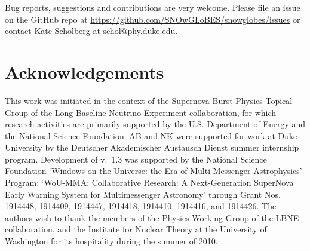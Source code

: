 \documentclass{article}
\begin{document}
Bug reports, suggestions and contributions are very welcome.
Please file an issue on the GitHub repo at \url{https://github.com/SNOwGLoBES/snowglobes/issues} or contact Kate Scholberg at \href{mailto:schol@phy.duke.edu}{schol@phy.duke.edu}.


\section{Acknowledgements}
This work was initiated in the context of the Supernova Burst Physics Topical Group of the
Long Baseline Neutrino Experiment collaboration, for which research activities are primarily supported by the U.S. Department of Energy and the National Science Foundation. AB and NK were supported for work at Duke University by the Deutscher Akademischer Austausch Dienst summer internship program. Development of v.~1.3 was supported by the National Science Foundation `Windows on the Universe: the Era of Multi-Messenger Astrophysics' Program: `WoU-MMA: Collaborative Research: A Next-Generation SuperNova Early Warning System for Multimessenger Astronomy' through Grant Nos. 1914448, 1914409, 1914447, 1914418, 1914410, 1914416, and 1914426. The authors wish to thank the members of the Physics Working Group of the LBNE collaboration, and the Institute for Nuclear Theory at the University of Washington for its hospitality during the summer of 2010.
\end{document}
